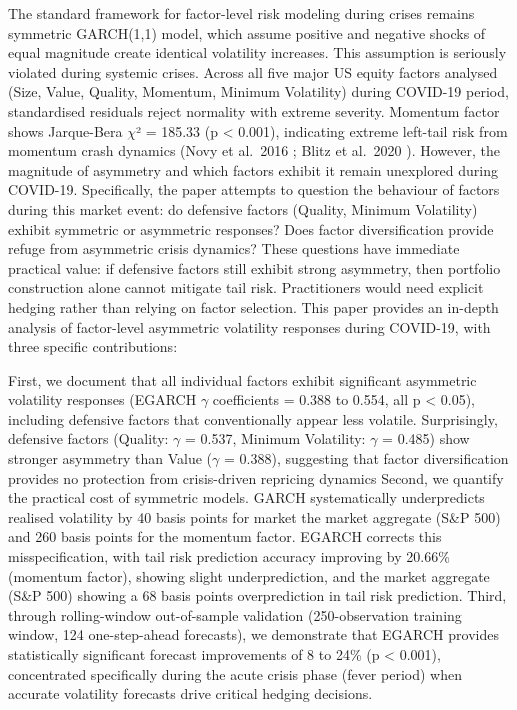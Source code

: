 \documentclass{article}
\begin{document}
The standard framework for factor-level risk modeling during crises remains symmetric GARCH(1,1) model, which assume positive and negative shocks of equal magnitude create identical volatility increases. This assumption is seriously violated during systemic crises. Across all five major US equity factors analysed (Size, Value, Quality, Momentum, Minimum Volatility) during COVID-19 period, standardised residuals reject normality with extreme severity. Momentum factor shows Jarque-Bera $\chi$² = 185.33 (p < 0.001), indicating extreme left-tail risk from momentum crash dynamics (Novy et al. 2016 \cite{novymarx2016}; Blitz et al. 2020 \cite{blitz2020}). However, the magnitude of asymmetry and which factors exhibit it remain unexplored during COVID-19. Specifically, the paper attempts to question the behaviour of factors during this market event: do defensive factors (Quality, Minimum Volatility) exhibit symmetric or asymmetric responses? Does factor diversification provide refuge from asymmetric crisis dynamics? These questions have immediate practical value: if defensive factors still exhibit strong asymmetry, then portfolio construction alone cannot mitigate tail risk. Practitioners would need explicit hedging rather than relying on factor selection. This paper provides an in-depth analysis of factor-level asymmetric volatility responses during COVID-19, with three specific contributions:\newline

First, we document that all individual factors exhibit significant asymmetric volatility responses (EGARCH $\gamma$ coefficients = 0.388 to 0.554, all p < 0.05), including defensive factors that conventionally appear less volatile. Surprisingly, defensive factors (Quality: $\gamma$ = 0.537, Minimum Volatility: $\gamma$ = 0.485) show stronger asymmetry than Value ($\gamma$ = 0.388), suggesting that factor diversification provides no protection from crisis-driven repricing dynamics Second, we quantify the practical cost of symmetric models. GARCH systematically underpredicts realised volatility by 40 basis points for market the market aggregate (S\&P 500) and 260 basis points for the momentum factor. EGARCH corrects this misspecification, with tail risk prediction accuracy improving by 20.66\% (momentum factor), showing slight underprediction, and the market aggregate (S\&P 500) showing a 68 basis points overprediction in tail risk prediction. Third, through rolling-window out-of-sample validation (250-observation training window, 124 one-step-ahead forecasts), we demonstrate that EGARCH provides statistically significant forecast improvements of 8 to 24\% (p < 0.001), concentrated specifically during the acute crisis phase (fever period) when accurate volatility forecasts drive critical hedging decisions.\newline
\end{document}
